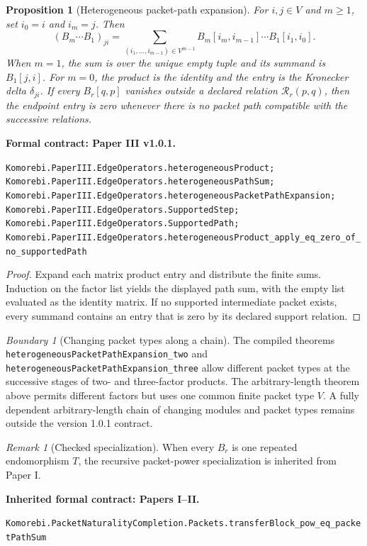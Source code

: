 \documentclass[11pt,a4paper]{article}
\theoremstyle{plain}
\newtheorem{proposition}[proposition]{Proposition}
\theoremstyle{definition}
\theoremstyle{remark}
\newtheorem{remark}[remark]{Remark}
\newtheorem{boundary}[boundary]{Boundary}
\newcommand{\leanname}[1]{\nolinkurl{#1}}
\newcommand{\statusleanthree}[1]{\par\smallskip\noindent\begin{minipage}{\linewidth}{\color{leanblue}\textbf{Formal contract: Paper III v1.0.1.}}\par\begingroup\small\raggedright\leanname{#1}\par\endgroup\end{minipage}\par\smallskip}
\newcommand{\statusleanprior}[1]{\par\smallskip\noindent\begin{minipage}{\linewidth}{\color{leanblue}\textbf{Inherited formal contract: Papers I--II.}}\par\begingroup\small\raggedright\leanname{#1}\par\endgroup\end{minipage}\par\smallskip}
\begin{document}
\begin{proposition}[Heterogeneous packet-path expansion]
\label{prop:heterogeneous-path}
For $i,j\in V$ and $m\geq1$, set $i_0=i$ and $i_m=j$.  Then
\[
\boxed{
(B_m\cdots B_1)_{ji}
=
\sum_{(i_1,\ldots,i_{m-1})\in V^{m-1}}
  B_m[i_m,i_{m-1}]\cdots B_1[i_1,i_0].
}
\]
When $m=1$, the sum is over the unique empty tuple and its summand is
$B_1[j,i]$.
For $m=0$, the product is the identity and the entry is the Kronecker delta
$\delta_{ji}$.  If every $B_r[q,p]$ vanishes outside a declared relation
$\mathcal R_r(p,q)$, then the endpoint entry is zero whenever there is no
packet path compatible with the successive relations.
\end{proposition}
\statusleanthree{Komorebi.PaperIII.EdgeOperators.heterogeneousProduct; Komorebi.PaperIII.EdgeOperators.heterogeneousPathSum; Komorebi.PaperIII.EdgeOperators.heterogeneousPacketPathExpansion; Komorebi.PaperIII.EdgeOperators.SupportedStep; Komorebi.PaperIII.EdgeOperators.SupportedPath; Komorebi.PaperIII.EdgeOperators.heterogeneousProduct_apply_eq_zero_of_no_supportedPath}

\begin{proof}
Expand each matrix product entry and distribute the finite sums.  Induction on
the factor list yields the displayed path sum, with the empty list evaluated
as the identity matrix.  If no supported intermediate packet exists, every
summand contains an entry that is zero by its declared support relation.
\end{proof}

\begin{boundary}[Changing packet types along a chain]
The compiled theorems
\leanname{heterogeneousPacketPathExpansion_two} and
\leanname{heterogeneousPacketPathExpansion_three} allow different packet
types at the successive stages of two- and three-factor products.  The
arbitrary-length theorem above permits different factors but uses one common
finite packet type $V$.  A fully dependent arbitrary-length chain of changing
modules and packet types remains outside the version 1.0.1 contract.
\end{boundary}

\begin{remark}[Checked specialization]
When every $B_r$ is one repeated endomorphism $T$, the recursive packet-power
specialization is inherited from Paper I.
\end{remark}
\statusleanprior{Komorebi.PacketNaturalityCompletion.Packets.transferBlock_pow_eq_packetPathSum}
\end{document}
